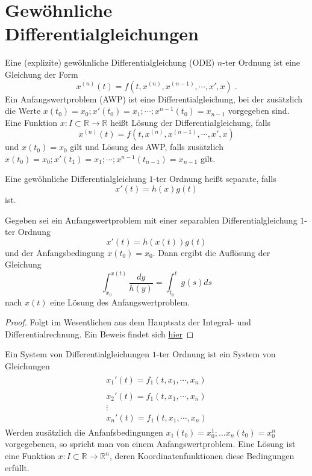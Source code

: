 \section{Gewöhnliche Differentialgleichungen}


\begin{Definition}
Eine (explizite) gewöhnliche Differentialgleichung (ODE) $n$-ter Ordnung ist eine Gleichung der Form
$$ x^{(n)}(t) = f(t, x^{(n)}, x^{(n-1)} , \cdots , x', x) \; .$$ 
Ein Anfangswertproblem (AWP) ist eine Differentialgleichung, bei der zusätzlich die Werte $x(t_0) = x_0 ; x'(t_0) = x_1; \cdots ; x^{n-1}(t_{0})= x_{n-1}  $ vorgegeben sind. Eine Funktion $x : I \subset \mathbb{R} \to \mathbb{R}$ heißt Lösung der Differentialgleichung, falls
$$ x^{(n)}(t) = f(t, x^{(n)}, x^{(n-1)} , \cdots , x', x) $$ und $x(t_0) = x_0$ gilt und Lösung des AWP, falls zusätzlich $x(t_0) = x_0 ; x'(t_1) = x_1; \cdots ; x^{n-1}(t_{n-1})= x_{n-1} $ gilt. 
\end{Definition}


\begin{Definition}
Eine gewöhnliche Differentialgleichung $1$-ter Ordnung heißt separate, falls
$$ x'(t) = h(x)g(t)$$ ist.
\end{Definition}


\begin{Satz}
Gegeben sei ein Anfangswertproblem mit einer separablen  Differentialgleichung $1$-ter Ordnung
$$ x'(t) = h(x(t))g(t)$$ und der Anfangsbedingung $x(t_0)= x_0$. Dann ergibt die Auflösung der Gleichung 
$$ \int_{x_0}^{x(t)} \frac{dy}{h(y)}  =  \int_{t_0}^{t} g(s) ds $$  nach $x(t)$ eine Lösung des Anfangswertproblem.
\end{Satz}
\begin{proof}
Folgt im Wesentlichen aus dem Hauptsatz der Integral- und Differentialrechnung.
Ein Beweis findet sich \href{https://de.wikipedia.org/wiki/Trennung_der\_Ver%C3%A4nderlichen}{hier}
\end{proof}


\begin{Definition}
Ein System von Differentialgleichungen $1$-ter Ordnung ist ein System von Gleichungen
\begin{align*}
\begin{matrix} x_1'(t) = f_1(t, x_1, \cdots, x_n ) \\  \\ x_2'(t) = f_1(t, x_1, \cdots, x_n ) \\  \vdots \\  x_n'(t) = f_1(t, x_1, \cdots, x_n )\end{matrix}
\end{align*}
Werden zusätzlich die Anfanfsbedingungen $x_1(t_0)= x_0^1; \dots x_n(t_0) = x_0^n$ vorgegebenen, so spricht man von einem Anfangswertproblem.
Eine Lösung ist eine Funktion $x : I \subset \mathbb{R} \to \mathbb{R}^n$, deren Koordinatenfunktionen diese Bedingungen erfüllt.
\end{Definition}

